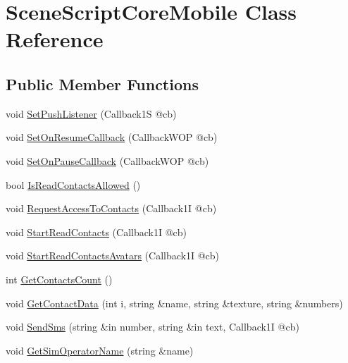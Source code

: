 \hypertarget{class_scene_script_core_mobile}{}\section{Scene\+Script\+Core\+Mobile Class Reference}
\label{class_scene_script_core_mobile}
\subsection*{Public Member Functions}
\begin{DoxyCompactItemize}
\item 
void \hyperlink{class_scene_script_core_mobile_af80fadb6d060cc7ae790a996521bdbc1}{Set\+Push\+Listener} (Callback1S @cb)
\item 
void \hyperlink{class_scene_script_core_mobile_aa2bf0e1fdd08bbaeb8a8c77d01cbf11c}{Set\+On\+Resume\+Callback} (Callback\+W\+OP @cb)
\item 
void \hyperlink{class_scene_script_core_mobile_afda47dc93fb520437a689a1acc52be85}{Set\+On\+Pause\+Callback} (Callback\+W\+OP @cb)
\item 
bool \hyperlink{class_scene_script_core_mobile_a3a6620cdb6dfbe9bc34edfabde93b8ef}{Is\+Read\+Contacts\+Allowed} ()
\item 
void \hyperlink{class_scene_script_core_mobile_ad48ba9c214510f891dd055cc04d3a77e}{Request\+Access\+To\+Contacts} (Callback1I @cb)
\item 
void \hyperlink{class_scene_script_core_mobile_aa8c4bc72675c16bac8e46906e55a26c8}{Start\+Read\+Contacts} (Callback1I @cb)
\item 
void \hyperlink{class_scene_script_core_mobile_a98d84f8e5a4aaa629fbb2496ba697551}{Start\+Read\+Contacts\+Avatars} (Callback1I @cb)
\item 
int \hyperlink{class_scene_script_core_mobile_a92a5d4e0afdb25d6aa3dc6ae95ca034a}{Get\+Contacts\+Count} ()
\item 
void \hyperlink{class_scene_script_core_mobile_ab91eabbfa351de0cbfa0f5262641d9e4}{Get\+Contact\+Data} (int i, string \&name, string \&texture, string \&numbers)
\item 
void \hyperlink{class_scene_script_core_mobile_ac46247fdf455476f8373413f3d23f75b}{Send\+Sms} (string \&in number, string \&in text, Callback1I @cb)
\item 
void \hyperlink{class_scene_script_core_mobile_af43ee93a60350979461600a320ed266d}{Get\+Sim\+Operator\+Name} (string \&name)
\item 

\end{DoxyCompactItemize}

